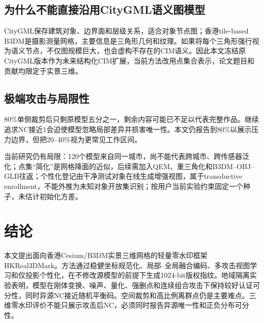 \documentclass[UTF8,fontset=fandol,11pt]{ctexart}
\newcommand{\method}{HKReal3DMark}
\begin{document}
\subsection{为什么不能直接沿用CityGML语义图模型}
CityGML保存建筑对象、边界面和层级关系，适合对象节点图；香港tile-based B3DM是摄影测量网格，主要信息是三角形几何和纹理。如果将每个三角形强行视为语义节点，不仅图规模巨大，也会虚构不存在的CIM语义。因此本文冻结原CityGML版本作为未来结构化CIM扩展，当前方法改用点集合表示，论文题目和贡献均限定于实景三维。

\subsection{极端攻击与局限性}
80\%单侧裁剪后只剩原模型五分之一，剩余内容可能已不足以代表完整作品。继续追求NC接近1会迫使模型忽略局部差异并损害唯一性。本文仍报告到80\%以展示压力边界，但把20--40\%视为更常见工作区间。

当前研究仍有局限：120个模型来自同一城市，尚不能代表跨城市、跨传感器泛化；点集“简化”是网格降面的近似，后续需加入QEM、重三角化和B3DM--OBJ--GLB往返；个性化登记由干净测试对象在线生成增强视图，属于transductive enrollment，不能外推为未知对象开放集识别；按用户当前实验约束固定一个种子，未估计初始化方差。

\section{结论}
本文提出面向香港Cesium/B3DM实景三维网格的轻量零水印框架\method。方法通过稳健坐标规范化、局部--全局融合编码、多攻击视图学习和仅投影个性化，在不修改源模型的前提下生成1024-bit版权指纹。地域隔离实验表明，模型在刚体变换、噪声、量化、强删点和连续组合攻击下保持较好认证可分性，同时异源NC接近随机平衡码。空间裁剪和高比例离群点仍是主要难点。三维零水印评价不能只展示攻击后NC，必须同时报告异源唯一性和正负分布可分性。

\end{document}
